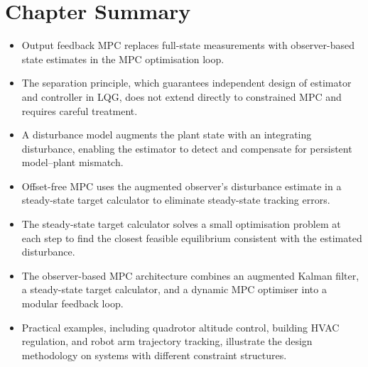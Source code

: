 \section*{Chapter Summary}
\begin{itemize}
    \item Output feedback MPC replaces full-state measurements with observer-based state estimates in the MPC optimisation loop.
    \item The separation principle, which guarantees independent design of estimator and controller in LQG, does not extend directly to constrained MPC and requires careful treatment.
    \item A disturbance model augments the plant state with an integrating disturbance, enabling the estimator to detect and compensate for persistent model--plant mismatch.
    \item Offset-free MPC uses the augmented observer's disturbance estimate in a steady-state target calculator to eliminate steady-state tracking errors.
    \item The steady-state target calculator solves a small optimisation problem at each step to find the closest feasible equilibrium consistent with the estimated disturbance.
    \item The observer-based MPC architecture combines an augmented Kalman filter, a steady-state target calculator, and a dynamic MPC optimiser into a modular feedback loop.
    \item Practical examples, including quadrotor altitude control, building HVAC regulation, and robot arm trajectory tracking, illustrate the design methodology on systems with different constraint structures.
\end{itemize}

